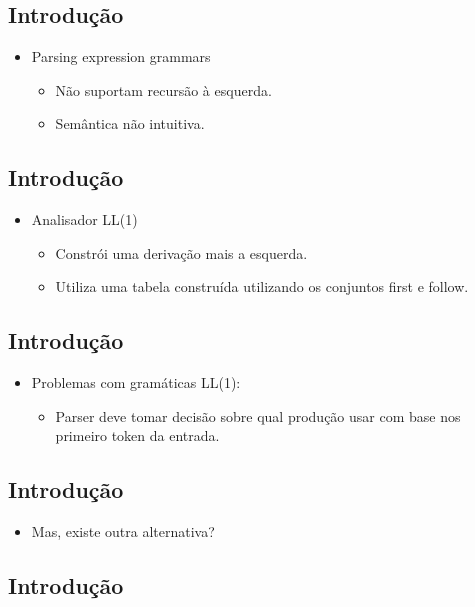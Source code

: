 \documentclass[11pt]{article}
\begin{document}
\subsection*{Introdução}
\label{sec:orgea1a920}

\begin{itemize}
\item Parsing expression grammars
\begin{itemize}
\item Não suportam recursão à esquerda.
\item Semântica não intuitiva.
\end{itemize}
\end{itemize}
\subsection*{Introdução}
\label{sec:orgcbe5ca0}

\begin{itemize}
\item Analisador LL(1)
\begin{itemize}
\item Constrói uma derivação mais a esquerda.
\item Utiliza uma tabela construída utilizando os conjuntos first e follow.
\end{itemize}
\end{itemize}
\subsection*{Introdução}
\label{sec:orge56f22d}

\begin{itemize}
\item Problemas com gramáticas LL(1):
\begin{itemize}
\item Parser deve tomar decisão sobre qual produção usar com base nos
primeiro token da entrada.
\end{itemize}
\end{itemize}
\subsection*{Introdução}
\label{sec:org922bc31}

\begin{itemize}
\item Mas, existe outra alternativa?
\end{itemize}
\subsection*{Introdução}
\label{sec:org05d6357}
\end{document}
